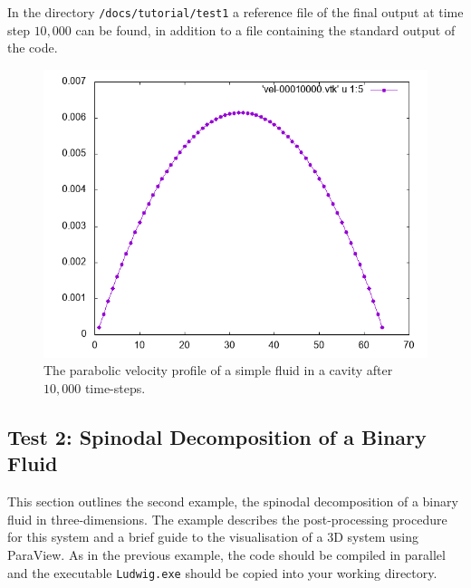 \documentclass[11pt,twoside,a4paper]{article}
\begin{document}
\begin{enumerate}
In the directory \texttt{/docs/tutorial/test1} a reference file of the final 
output at time step $10,000$ can be found, in addition to a file containing the standard output of the code.
\end{enumerate} 

\begin{figure}[h]
\begin{center}
\includegraphics[width=0.8\linewidth]{velProf.png}
  \caption{The parabolic velocity profile of a simple fluid in a cavity after $10,000$ time-steps.}
  \label{fig:velocityProfile}
  \end{center}
\end{figure}

\subsection{Test 2: Spinodal Decomposition of a Binary Fluid}

This section outlines the second example, the spinodal decomposition of a binary fluid in 
three-dimensions.
The example describes the post-processing procedure for this system and a brief guide to 
the visualisation of a 3D system using ParaView.
As in the previous example, the code should be compiled in parallel and the executable 
\texttt{Ludwig.exe} should be copied into your working directory.
\end{document}
